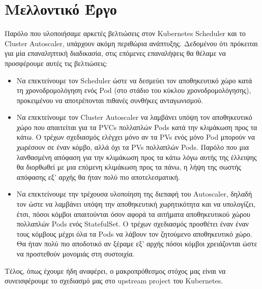 \section{Μελλοντικό Έργο} \label{section:gr-conclusion_future_work} Παρόλο που
υλοποιήσαμε αρκετές βελτιώσεις στον Kubernetes Scheduler και το Cluster
Autoscaler, υπάρχουν ακόμη περιθώρια ανάπτυξης. Δεδομένου ότι πρόκειται για μία
επαναληπτική διαδικασία, στις επόμενες επαναλήψεις θα θέλαμε να προσφέρουμε
αυτές τις βελτιώσεις:

\begin{itemize}
      \item Να επεκτείνουμε τον Scheduler ώστε να δεσμεύει τον αποθηκευτικό χώρο
            κατά τη χρονοδρομολόγηση ενός Pod (στο στάδιο 
            του κύκλου χρονοδρομολόγησης), προκειμένου να αποτρέπονται
            πιθανές συνθήκες ανταγωνισμού.
      \item Να επεκτείνουμε τον Cluster Autoscaler να λαμβάνει υπόψη τον
            αποθηκευτικό χώρο που απαιτείται για τα PVCs πολλαπλών Pods
            κατά την κλιμάκωση προς τα κάτω. Ο τρέχων σχεδιασμός ελέγχει
            μόνο αν τα PVs ενός μόνο Pod μπορούν να χωρέσουν σε έναν
            κόμβο, αλλά όχι τα PVs πολλαπλών Pods. Παρόλο που μια
            λανθασμένη απόφαση για την κλιμάκωση προς τα κάτω λόγω αυτής
            της έλλειψης θα διορθωθεί με μια επόμενη κλιμάκωση προς τα
            πάνω, η λήψη της σωστής απόφασης εξ' αρχής θα ήταν πολύ πιο
            αποτελεσματική.
      \item Να επεκτείνουμε την τρέχουσα υλοποίηση της διεπαφή
             του Autoscaler, δηλαδή τον
             ώστε να λαμβάνει υπόψη την
            αποθηκευτική χωρητικότητα  και να υπολογίζει, έτσι, πόσοι
            κόμβοι απαιτούνται όσον αφορά τα αιτήματα αποθηκευτικού χώρου
            πολλαπλών Pods ενός StatefulSet. Ο τρέχων σχεδιασμός προσθέτει
            έναν έναν τους κόμβους μέχρι όλα τα Pods να λάβουν τον
            ζητούμενο αποθηκευτικό χώρο. Θα ήταν πολύ πιο αποδοτικό αν
            ξέραμε εξ' αρχής πόσοι κόμβοι χρειάζονται ώστε να προστεθούν
            μονομιάς στη συστοιχία.
\end{itemize}


Τέλος, όπως έχουμε ήδη αναφέρει, ο μακροπρόθεσμος στόχος μας είναι να
συνεισφέρουμε το σχεδιασμό μας στο upstream project του Kubernetes.
